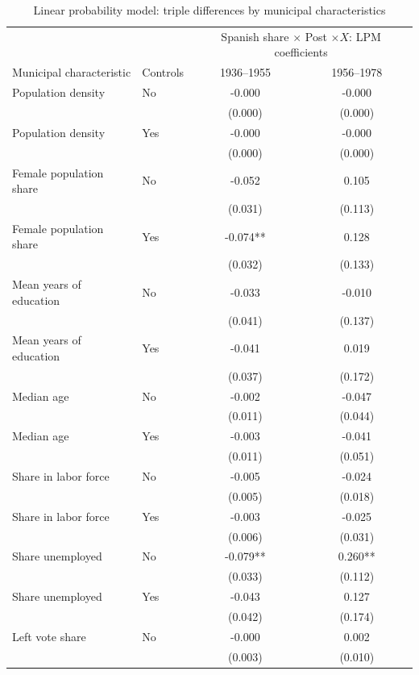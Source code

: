 \begin{table}[!htbp]
\centering
\renewcommand{\arraystretch}{1.25}
\setlength{\tabcolsep}{6pt}
\caption{Linear probability model: triple differences by municipal characteristics}
\label{tab:lpm_triple_mfx_stata}
\small
\begin{tabular}{llcc}
\hline
 & & \multicolumn{2}{c}{Spanish share \(\times\) Post \(\times X\): LPM coefficients} \\
Municipal characteristic & Controls & 1936--1955 & 1956--1978 \\
\hline
Population density & No & -0.000 & -0.000 \\
 & & (0.000) & (0.000) \\
Population density & Yes & -0.000 & -0.000 \\
 & & (0.000) & (0.000) \\
\addlinespace
Female population share & No & -0.052 & 0.105 \\
 & & (0.031) & (0.113) \\
Female population share & Yes & -0.074** & 0.128 \\
 & & (0.032) & (0.133) \\
\addlinespace
Mean years of education & No & -0.033 & -0.010 \\
 & & (0.041) & (0.137) \\
Mean years of education & Yes & -0.041 & 0.019 \\
 & & (0.037) & (0.172) \\
\addlinespace
Median age & No & -0.002 & -0.047 \\
 & & (0.011) & (0.044) \\
Median age & Yes & -0.003 & -0.041 \\
 & & (0.011) & (0.051) \\
\addlinespace
Share in labor force & No & -0.005 & -0.024 \\
 & & (0.005) & (0.018) \\
Share in labor force & Yes & -0.003 & -0.025 \\
 & & (0.006) & (0.031) \\
\addlinespace
Share unemployed & No & -0.079** & 0.260** \\
 & & (0.033) & (0.112) \\
Share unemployed & Yes & -0.043 & 0.127 \\
 & & (0.042) & (0.174) \\
\addlinespace
Left vote share & No & -0.000 & 0.002 \\
 & & (0.003) & (0.010) \\

\end{tabular}
\end{table}
